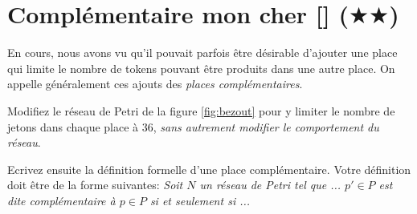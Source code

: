 \documentclass[a4paper, titlepage]{article}
\numberwithin{figure}{section}
\numberwithin{table}{section}
\begin{document}
  \section{Complémentaire mon cher [\Keyboard] ($\bigstar\bigstar$)}
		En cours, nous avons vu qu'il pouvait parfois être désirable d'ajouter une place
    qui limite le nombre de tokens pouvant être produits dans une autre place.
    On appelle généralement ces ajouts des \emph{places complémentaires}.

		Modifiez le réseau de Petri de la figure \ref{fig:bezout} pour y limiter le nombre de jetons dans chaque place à 36, \emph{sans autrement modifier le comportement du réseau}.

		Ecrivez ensuite la définition formelle d'une place complémentaire.
    Votre définition doit être de la forme suivantes:
    \emph{Soit $N$ un réseau de Petri tel que ... $p'\in P$ est dite complémentaire à $p \in P$ si et seulement si ...}
\end{document}
